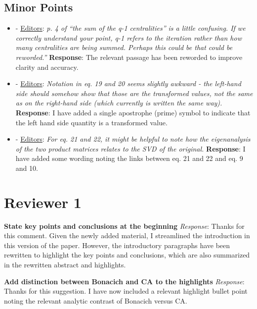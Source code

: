\documentclass{article}
\begin{document}
\subsection*{Minor Points}
\begin{itemize}
    \item - \underline{Editors}: \textit{p. 4 of ``the sum of the q-1 centralities'' is a little confusing. If we correctly understand your point, q-1 refers to the iteration rather than how many centralities are being summed. Perhaps this could be that could be reworded.''} \textbf{Response}: The relevant passage has been reworded to improve clarity and accuracy. 
    \item -  \underline{Editors}: \textit{Notation in eq. 19 and 20 seems slightly awkward - the left-hand side should somehow show that those are the transformed values, not the same as on the right-hand side (which currently is written the same way).} \textbf{Response}: I have added a single apostrophe (prime) symbol to indicate that the left hand side quantity is a transformed value.
    \item - \underline{Editors}: \textit{For eq. 21 and 22, it might be helpful to note how the eigenanalysis of the two product matrices relates to the SVD of the original.} \textbf{Response}: I have added some wording noting the links between eq. 21 and 22 and eq. 9 and 10.
\end{itemize}

\newpage
\section*{Reviewer 1}

\noindent\textbf{State key points and conclusions at the beginning}\newline
\textit{Response}: Thanks for this comment. Given the newly added material, I streamlined the introduction in this version of the paper. However, the introductory paragraphs have been rewritten to highlight the key points and conclusions, which are also summarized in the rewritten abstract and highlights. \newline

\noindent\textbf{Add distinction between Bonacich and CA to the highlights}\newline
\textit{Response}: Thanks for this suggestion. I have now included a relevant highlight bullet point noting the relevant analytic contrast of Bonacich versus CA. \newline
\end{document}
